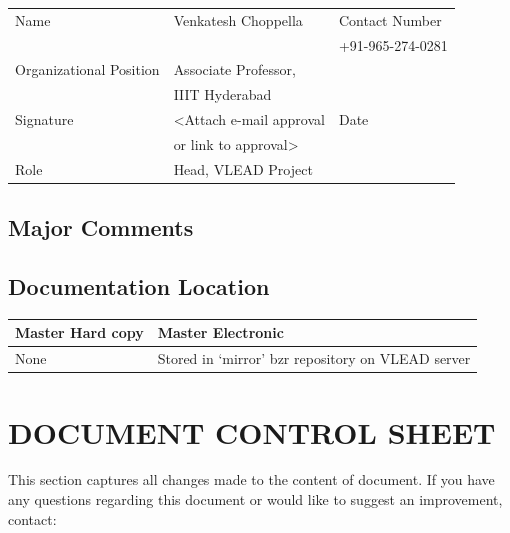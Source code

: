\documentclass[11pt]{article}
\begin{document}
\begin{center}
\begin{tabular}{lll}
\hline
 Name                     &  Venkatesh Choppella      &  Contact Number    \\
                          &                           &  +91-965-274-0281  \\
 Organizational Position  &  Associate Professor,     &                    \\
                          &  IIIT Hyderabad           &                    \\
 Signature                &  <Attach e-mail approval  &  Date              \\
                          &  or link to approval>     &                    \\
 Role                     &  Head, VLEAD Project      &                    \\
\hline
\end{tabular}
\end{center}



\subsection{Major Comments}
\label{sec-15.1}

   
\subsection{Documentation Location}
\label{sec-15.2}


\begin{center}
\begin{tabular}{ll}
\hline
 Master Hard copy  &  Master Electronic                                  \\
\hline
 None              &  Stored in `mirror' bzr repository on VLEAD server  \\
\hline
\end{tabular}
\end{center}


  
\section{DOCUMENT CONTROL SHEET}
\label{sec-16}

This section captures all changes made to the content of document. If
you have any questions regarding this document or would like to
suggest an improvement, contact:
\end{document}
